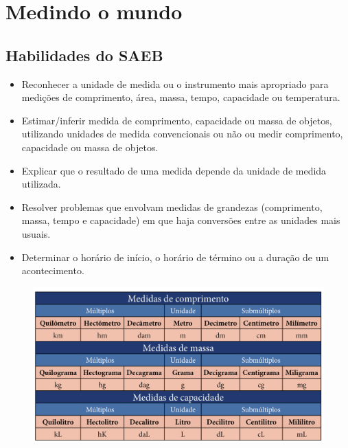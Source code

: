 \chapter{Medindo o mundo}


\section{Habilidades do SAEB}

\begin{itemize}
\item Reconhecer a unidade de medida ou o instrumento mais apropriado para
medições de comprimento, área, massa, tempo, capacidade ou temperatura.

\item Estimar/inferir medida de comprimento, capacidade ou massa de objetos,
utilizando unidades de medida convencionais ou não ou medir comprimento,
capacidade ou massa de objetos.

\item Explicar que o resultado de uma medida depende da unidade de medida utilizada.

\item Resolver problemas que envolvam medidas de grandezas (comprimento,
massa, tempo e capacidade) em que haja conversões entre as unidades mais
usuais.

\item Determinar o horário de início, o horário de término ou a duração de
um acontecimento.
\end{itemize}


\begin{figure}[htpb!]
\includegraphics[width=\textwidth]{../ilustracoes/MAT5/SAEB_5ANO_MAT_figura30_1.png}
\end{figure}

